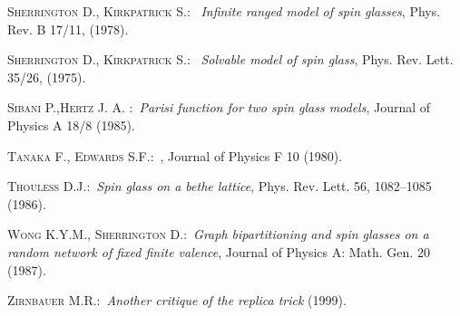 \textsc{Sherrington D., Kirkpatrick S.}:\ \textit{ Infinite ranged model of spin glasses}, Phys. Rev. B 17/11,  (1978).

\textsc{Sherrington D., Kirkpatrick S.}:\ \textit{ Solvable model of spin glass}, Phys. Rev. Lett. 35/26, (1975).

 \textsc{Sibani P.,Hertz J. A.} :\ \textit{Parisi function for two spin glass models},
Journal of Physics A 18/8 (1985).

\textsc{Tanaka F., Edwards S.F.}:\ , Journal of Physics F 10 (1980).

\textsc{Thouless D.J.}:\ \textit{Spin glass on a bethe lattice}, Phys. Rev. Lett. 56, 1082–1085 (1986).


\textsc{Wong K.Y.M., Sherrington D.}:\ \textit{Graph bipartitioning and spin glasses on a random network of fixed finite valence}, Journal of Physics A: Math. Gen. 20 (1987).


 \textsc{Zirnbauer M.R.}:\ \textit{Another critique of the replica trick} (1999).
